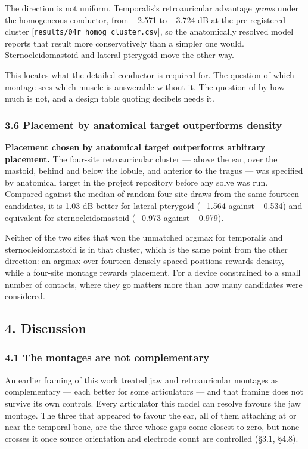 \documentclass[
  11pt,
]{article}
\newcounter{none} %
\begin{document}
The direction is not uniform. Temporalis's retroauricular advantage \emph{grows}
under the homogeneous conductor, from −2.571 to −3.724 dB at the pre-registered
cluster {[}\texttt{results/04r\_homog\_cluster.csv}{]}, so the anatomically resolved model
reports that result more conservatively than a simpler one would.
Sternocleidomastoid and lateral pterygoid move the other way.

This locates what the detailed conductor is required for. The question of
which montage sees which muscle is answerable without it. The question of by
how much is not, and a design table quoting decibels needs it.

\subsubsection{3.6 Placement by anatomical target outperforms density}\label{placement-by-anatomical-target-outperforms-density}

\textbf{Placement chosen by anatomical target outperforms arbitrary placement.} The
four-site retroauricular cluster --- above the ear, over the mastoid, behind and
below the lobule, and anterior to the tragus --- was specified by anatomical
target in the project repository before any solve was run. Compared against
the median of random four-site draws from the same fourteen candidates, it is
1.03 dB better for lateral pterygoid (−1.564 against −0.534) and equivalent
for sternocleidomastoid (−0.973 against −0.979).

Neither of the two sites that won the unmatched argmax for temporalis and
sternocleidomastoid is in that cluster, which is the same point from the other
direction: an argmax over fourteen densely spaced positions rewards density,
while a four-site montage rewards placement. For a device constrained to a
small number of contacts, where they go matters more than how many candidates
were considered.

\subsection{4. Discussion}\label{discussion}

\subsubsection{4.1 The montages are not complementary}\label{the-montages-are-not-complementary}

An earlier framing of this work treated jaw and retroauricular montages as
complementary --- each better for some articulators --- and that framing does not
survive its own controls. Every articulator this model can resolve favours the
jaw montage. The three that appeared to favour the ear, all of them attaching at
or near the temporal bone, are the three whose gaps come closest to zero, but
none crosses it once source orientation and electrode count are controlled
(§3.1, §4.8).
\end{document}
